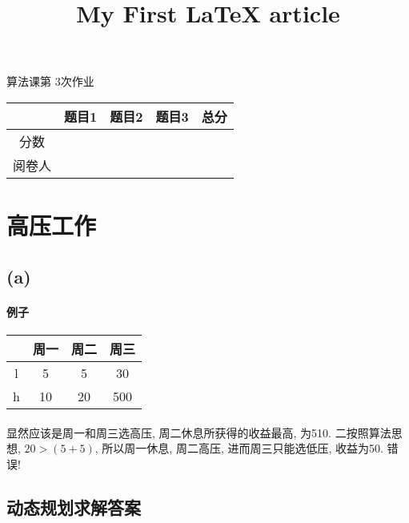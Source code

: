 \documentclass[a4paper,10pt]{article}
\title{My First \LaTeX{} article}
\begin{document}
\begin{center}
\LARGE 算法课第 3次作业
~\\
\end{center}

\begin{center}
 \begin{tabular}{|c|c|c|c|c|}
\hline
      & 题目1 & 题目2 & 题目3 & 总分\\ \hline
 \multirow{2}{*}{分数} &\multirow{2}{*}{} &\multirow{2}{*}{} &\multirow{2}{*}{} &\multirow{2}{*}{}\\
 & & & & \\ \hline
 \multirow{2}{*}{阅卷人} &\multirow{2}{*}{} &\multirow{2}{*}{} &\multirow{2}{*}{} &\multirow{2}{*}{}\\
 & & & &  \\ \hline
\end{tabular}
\end{center}
\vspace{20pt}
\section{高压工作}
  \normalsize
  \subsection{(a)}

  \paragraph{例子}
  
  \begin{tabular}{|c|c|c|c|}
  \hline & 周一 & 周二 & 周三 \\
  \hline l & 5 & 5 & 30 \\
  \hline h & 10 & 20 & 500 \\
  \hline
  \end{tabular} 
  \paragraph{} 显然应该是周一和周三选高压, 周二休息所获得的收益最高, 为510. 二按照算法思想, $20>(5+5)$, 所以周一休息, 周二高压, 进而周三只能选低压, 收益为50. 错误!
  \subsection{动态规划求解答案} 
\end{document}
